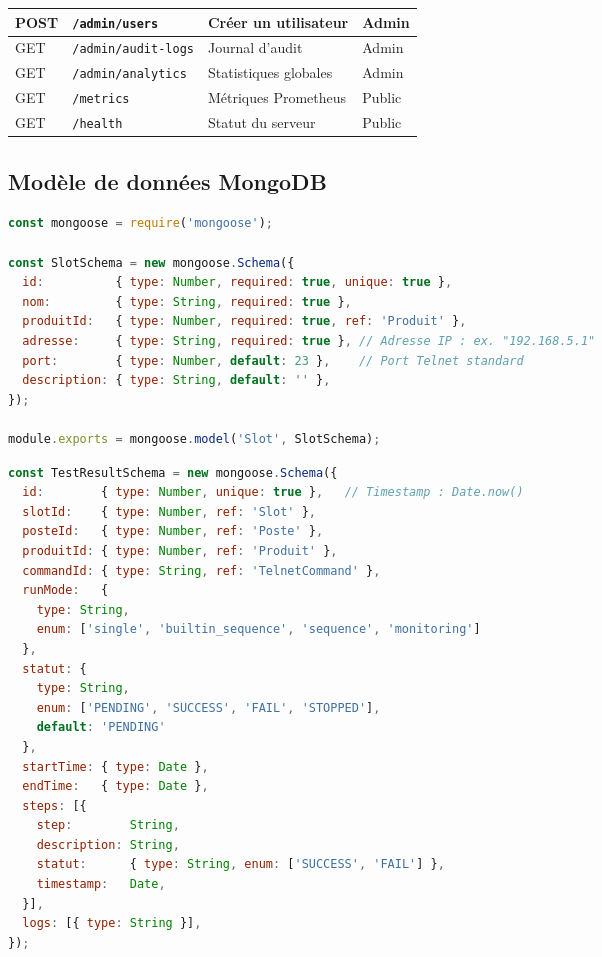 \begin{longtable}{|C{1.8cm}|L{5cm}|L{3cm}|C{2.5cm}|}
  POST   & \texttt{/admin/users}        & Créer un utilisateur     & Admin \\ \hline
  GET    & \texttt{/admin/audit-logs}   & Journal d'audit          & Admin \\ \hline
  GET    & \texttt{/admin/analytics}    & Statistiques globales    & Admin \\ \hline
  GET    & \texttt{/metrics}            & Métriques Prometheus     & Public \\ \hline
  GET    & \texttt{/health}             & Statut du serveur        & Public \\ \hline
\end{longtable}

\subsection{Modèle de données MongoDB}

\begin{lstlisting}[language=JavaScript,
  caption={Schéma Mongoose — collection \texttt{slots}},
  label={lst:schema_slot}]
const mongoose = require('mongoose');

const SlotSchema = new mongoose.Schema({
  id:          { type: Number, required: true, unique: true },
  nom:         { type: String, required: true },
  produitId:   { type: Number, required: true, ref: 'Produit' },
  adresse:     { type: String, required: true }, // Adresse IP : ex. "192.168.5.1"
  port:        { type: Number, default: 23 },    // Port Telnet standard
  description: { type: String, default: '' },
});

module.exports = mongoose.model('Slot', SlotSchema);
\end{lstlisting}

\begin{lstlisting}[language=JavaScript,
  caption={Schéma Mongoose — collection \texttt{testResults}},
  label={lst:schema_result}]
const TestResultSchema = new mongoose.Schema({
  id:        { type: Number, unique: true },   // Timestamp : Date.now()
  slotId:    { type: Number, ref: 'Slot' },
  posteId:   { type: Number, ref: 'Poste' },
  produitId: { type: Number, ref: 'Produit' },
  commandId: { type: String, ref: 'TelnetCommand' },
  runMode:   {
    type: String,
    enum: ['single', 'builtin_sequence', 'sequence', 'monitoring']
  },
  statut: {
    type: String,
    enum: ['PENDING', 'SUCCESS', 'FAIL', 'STOPPED'],
    default: 'PENDING'
  },
  startTime: { type: Date },
  endTime:   { type: Date },
  steps: [{
    step:        String,
    description: String,
    statut:      { type: String, enum: ['SUCCESS', 'FAIL'] },
    timestamp:   Date,
  }],
  logs: [{ type: String }],
});
\end{lstlisting}

